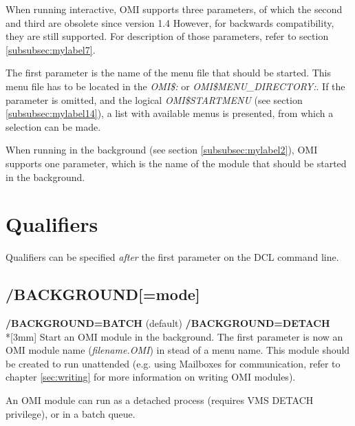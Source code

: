 \documentclass[a4paper]{book}
\newcommand{\vs}{\vspace{3mm}}
\renewcommand{\indent}{\hspace*{5mm}}
\begin{document}
When running interactive, OMI supports three parameters, of which the second 
and third are obsolete since version 1.4 However, for backwards 
compatibility, they are still supported. For description of those 
parameters, refer to section \ref{subsubsec:mylabel7}.

\vs

The first parameter is the name of the menu file that should be started. 
This menu file has to be located in the \textsl{OMI{\$}:} or \textsl{OMI{\$}MENU{\_}DIRECTORY:}. 
If the parameter is omitted, and the logical \textsl{OMI{\$}STARTMENU} (see section 
\ref{subsubsec:mylabel14}), a list with available menus is presented, 
from which a selection can be made.

\vs

When running in the background (see section \ref{subsubsec:mylabel2}), 
OMI supports one parameter, which is the name of the module that should be 
started in the background.

\section{Qualifiers}
\label{subsec:qualifiers}

Qualifiers can be specified \textit{after} the first parameter on the DCL
command line.

\subsection{/BACKGROUND[=mode]}
\label{subsubsec:mylabel2}

\vs

\indent\textbf{/BACKGROUND=BATCH} (default) \newline
\indent\textbf{/BACKGROUND=DETACH}\\*[3mm]
Start an OMI module in the background. The first parameter is now an OMI 
module name (\textsl{\textit{filename}.OMI}) in stead of a menu 
name. This module should be created to run unattended (e.g. using Mailboxes 
for communication, refer to chapter \ref{sec:writing} for more 
information on writing OMI modules).

\vs

An OMI module can run as a detached process (requires VMS DETACH privilege), or in a 
batch queue.
\end{document}
